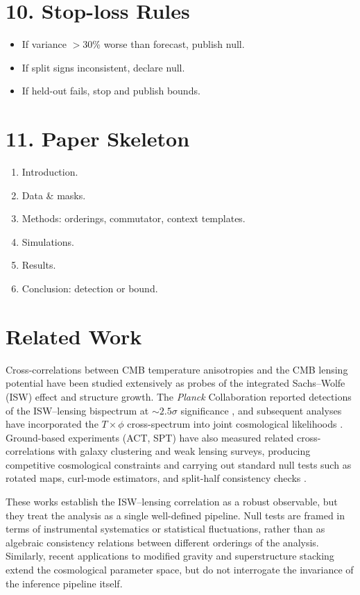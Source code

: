 \documentclass[11pt]{article}
\begin{document}
\section*{10. Stop-loss Rules}
\begin{itemize}
\item If variance $>30$\% worse than forecast, publish null.
\item If split signs inconsistent, declare null.
\item If held-out fails, stop and publish bounds.
\end{itemize}

\section*{11. Paper Skeleton}
\begin{enumerate}
\item Introduction.
\item Data \& masks.
\item Methods: orderings, commutator, context templates.
\item Simulations.
\item Results.
\item Conclusion: detection or bound.
\end{enumerate}

\section*{Related Work}

Cross-correlations between CMB temperature anisotropies and the CMB lensing potential have been studied extensively as probes of the integrated Sachs–Wolfe (ISW) effect and structure growth. The \textit{Planck} Collaboration reported detections of the ISW--lensing bispectrum at $\sim 2.5\sigma$ significance \cite{planck2015isw}, and subsequent analyses have incorporated the $T \times \phi$ cross-spectrum into joint cosmological likelihoods \cite{carron2022iswlensing}. Ground-based experiments (ACT, SPT) have also measured related cross-correlations with galaxy clustering and weak lensing surveys, producing competitive cosmological constraints and carrying out standard null tests such as rotated maps, curl-mode estimators, and split-half consistency checks \cite{hand2015act,shaikh2024act,kim2024actdesi}.

These works establish the ISW--lensing correlation as a robust observable, but they treat the analysis as a single well-defined pipeline. Null tests are framed in terms of instrumental systematics or statistical fluctuations, rather than as algebraic consistency relations between different orderings of the analysis. Similarly, recent applications to modified gravity \cite{chudaykin2025iswmg} and superstructure stacking \cite{hang2021superstructures} extend the cosmological parameter space, but do not interrogate the invariance of the inference pipeline itself.
\end{document}
